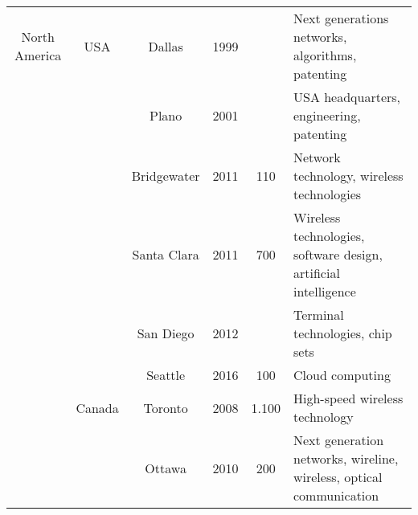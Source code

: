 \begin{sidewaystable}
\begin{tabularx}{1.0\textwidth}{cccccX}
North America 	& USA		& Dallas	& 1999			&				& Next generations networks, algorithms, patenting\footnotemark[12] \footnotemark[14] \\
				&			& Plano		& 2001\footnotemark[5]			& 				& USA headquarters, engineering, patenting\footnotemark[14] \\
				&			& Bridgewater & 2011\footnotemark[2] \footnotemark[14]		& 110\footnotemark[2]			& Network technology, wireless technologies\footnotemark[12] \footnotemark[14] \\
				&			& Santa Clara & 2011\footnotemark[5] \footnotemark[14]		& 700\footnotemark[14]			& Wireless technologies, software design, artificial intelligence\footnotemark[14] \\
				& 			& San Diego & 2012			&				& Terminal technologies, chip sets\footnotemark[12] \\
				&			& Seattle	& 2016\footnotemark[3]			& 100\footnotemark[3]			& Cloud computing\footnotemark[3] \\
		\cline{2-6}
				& Canada	& Toronto	& 2008			& 1.100\footnotemark[11]			& High-speed wireless technology\footnotemark[11] \\
				&			& Ottawa	& 2010\footnotemark[10]			& 200\footnotemark[13]			& Next generation networks, wireline, wireless, optical communication\footnotemark[10] \footnotemark[13]\\
		\cline{2-6}	
		\end{tabularx}

					
	\label{tab:huawei_advanced}	
\end{sidewaystable} 
